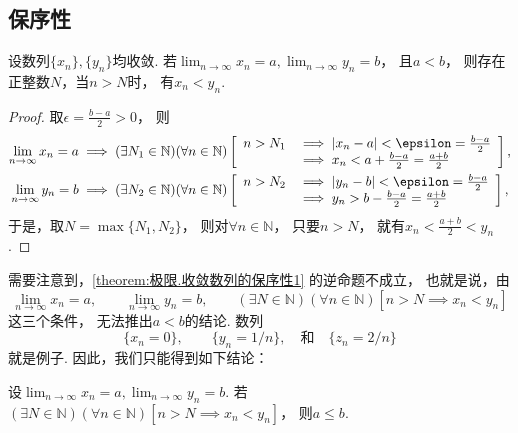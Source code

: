 \subsection{保序性}
\begin{theorem}[保序性]\label{theorem:极限.收敛数列的保序性1}
设数列\(\{x_n\},\{y_n\}\)均收敛.
若\(\lim_{n\to\infty} x_n = a,
\lim_{n\to\infty} y_n = b\)，
且\(a < b\)，
则存在正整数\(N\)，当\(n>N\)时，
有\(x_n < y_n\).
\begin{proof}
取\(\epsilon=\frac{b-a}2>0\)，
则\begin{gather*}
	\lim_{n\to\infty} x_n = a
	\implies
	(\exists N_1\in\mathbb{N})(\forall n\in\mathbb{N})
	\left[
		\begin{array}{rl}
			n>N_1
			&\implies
			\abs{x_n - a} < \epsilon = \frac{b-a}2 \\
			&\implies
			x_n < a + \frac{b-a}2 = \frac{a+b}2
		\end{array}
	\right], \\
	\lim_{n\to\infty} y_n = b
	\implies
	(\exists N_2\in\mathbb{N})(\forall n\in\mathbb{N})
	\left[
		\begin{array}{rl}
			n>N_2
			&\implies
			\abs{y_n - b} < \epsilon = \frac{b-a}2 \\
			&\implies
			y_n > b - \frac{b-a}2 = \frac{a+b}2
		\end{array}
	\right],
\end{gather*}
于是，取\(N = \max\{N_1,N_2\}\)，
则对\(\forall n\in\mathbb{N}\)，
只要\(n>N\)，
就有\(x_n < \frac{a+b}2 < y_n\).
\end{proof}
\end{theorem}

需要注意到，\cref{theorem:极限.收敛数列的保序性1} 的逆命题不成立，
也就是说，由\begin{equation*}
	\lim_{n\to\infty} x_n = a, \qquad
	\lim_{n\to\infty} y_n = b, \qquad
	(\exists N\in\mathbb{N})
	(\forall n\in\mathbb{N})
	[n>N \implies x_n < y_n]
\end{equation*}这三个条件，
无法推出\(a<b\)的结论.
数列\begin{equation*}
	\{x_n = 0\}, \qquad
	\{y_n = 1/n\},
	\quad\text{和}\quad
	\{z_n = 2/n\}
\end{equation*}就是例子.
因此，我们只能得到如下结论：
\begin{theorem}\label{theorem:极限.收敛数列的保序性2}
设\(\lim_{n\to\infty} x_n = a,
\lim_{n\to\infty} y_n = b\).
若\((\exists N\in\mathbb{N})
(\forall n\in\mathbb{N})
[n>N \implies x_n < y_n]\)，
则\(a \leq b\).
\end{theorem}

